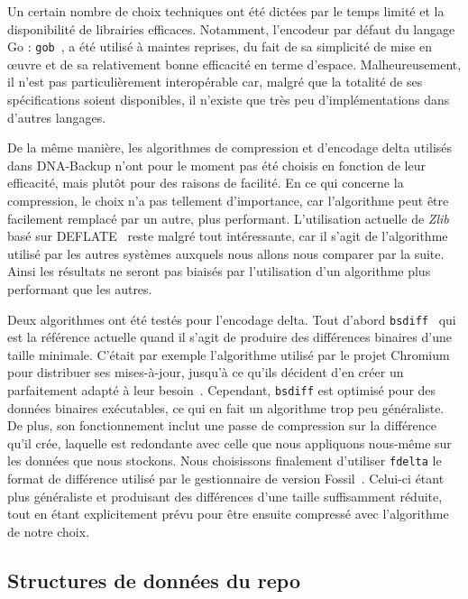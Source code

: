\documentclass[a4paper]{report}
\begin{document}
Un certain nombre de choix techniques ont été dictées par le temps limité et la disponibilité de librairies efficaces.
Notamment, l'encodeur par défaut du langage Go : \verb|gob|~\cite{pike2011gob},
a été utilisé à maintes reprises, du fait de sa simplicité de mise en œuvre
et de sa relativement bonne efficacité en terme d'espace.
Malheureusement, il n'est pas particulièrement interopérable car,
malgré que la totalité de ses spécifications soient disponibles,
il n'existe que très peu d'implémentations dans d'autres langages.

De la même manière, les algorithmes de compression et d'encodage delta utilisés dans DNA-Backup
n'ont pour le moment pas été choisis en fonction de leur efficacité,
mais plutôt pour des raisons de facilité.
En ce qui concerne la compression, le choix n'a pas tellement d'importance,
car l'algorithme peut être facilement remplacé par un autre, plus performant.
L'utilisation actuelle de \emph{Zlib}~\cite{rfc1950} basé sur DEFLATE~\cite{rfc1951} reste malgré tout intéressante,
car il s'agit de l'algorithme utilisé par les autres systèmes
auxquels nous allons nous comparer par la suite.
Ainsi les résultats ne seront pas biaisés par l'utilisation d'un algorithme plus performant que les autres.

Deux algorithmes ont été testés pour l'encodage delta.
Tout d'abord \verb|bsdiff|~\cite{percival2003naive} qui est la référence actuelle
quand il s'agit de produire des différences binaires d'une taille minimale.
C'était par exemple l'algorithme utilisé par le projet Chromium pour distribuer ses mises-à-jour,
jusqu'à ce qu'ils décident d'en créer un parfaitement adapté à leur besoin~\cite{chromium2012courgette}.
Cependant, \verb|bsdiff| est optimisé pour des données binaires exécutables,
ce qui en fait un algorithme trop peu généraliste.
De plus, son fonctionnement inclut une passe de compression sur la différence qu'il crée,
laquelle est redondante avec celle que nous appliquons nous-même sur les données que nous stockons.
Nous choisissons finalement d'utiliser \verb|fdelta| le format de différence utilisé par le gestionnaire de version Fossil~\cite{hipp2006fdelta}.
Celui-ci étant plus généraliste et produisant des différences d'une taille suffisamment réduite,
tout en étant explicitement prévu pour être ensuite compressé avec l'algorithme de notre choix.

\subsection{Structures de données du repo}
\end{document}
